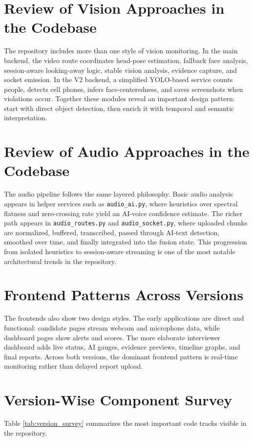 \documentclass[12pt,a4paper]{extreport}
\begin{document}
\section{Review of Vision Approaches in the Codebase}
The repository includes more than one style of vision monitoring. In the main backend, the video route coordinates head-pose estimation, fallback face analysis, session-aware looking-away logic, stable vision analysis, evidence capture, and socket emission. In the V2 backend, a simplified YOLO-based service counts people, detects cell phones, infers face-centeredness, and saves screenshots when violations occur. Together these modules reveal an important design pattern: start with direct object detection, then enrich it with temporal and semantic interpretation.

\section{Review of Audio Approaches in the Codebase}
The audio pipeline follows the same layered philosophy. Basic audio analysis appears in helper services such as \texttt{audio\_ai.py}, where heuristics over spectral flatness and zero-crossing rate yield an AI-voice confidence estimate. The richer path appears in \texttt{audio\_routes.py} and \texttt{audio\_socket.py}, where uploaded chunks are normalized, buffered, transcribed, passed through AI-text detection, smoothed over time, and finally integrated into the fusion state. This progression from isolated heuristics to session-aware streaming is one of the most notable architectural trends in the repository.

\section{Frontend Patterns Across Versions}
The frontends also show two design styles. The early applications are direct and functional: candidate pages stream webcam and microphone data, while dashboard pages show alerts and scores. The more elaborate interviewer dashboard adds live status, AI gauges, evidence previews, timeline graphs, and final reports. Across both versions, the dominant frontend pattern is real-time monitoring rather than delayed report upload.

\section{Version-Wise Component Survey}
Table \ref{tab:version_survey} summarizes the most important code tracks visible in the repository.
\end{document}
